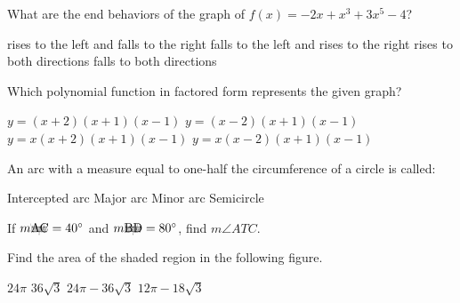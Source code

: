 \begin{questions}
\question What are the end behaviors of the graph of $f(x) = -2x + x^3 + 3x^5 - 4$?

\begin{multicols}{2}
\begin{choices}  
\choice rises to the left and falls to the right
\CorrectChoice falls to the left and rises to the right
\choice rises to both directions 
\choice falls to both directions
\end{choices}
\end{multicols} 

\question Which polynomial function in factored form represents the given graph?
\begin{choices}  
\choice $y = (x+2)(x+1)(x-1)$ 
\choice $y = (x-2)(x+1)(x-1)$ 
\CorrectChoice $y = x(x+2)(x+1)(x-1)$ 
\choice $y = x(x-2)(x+1)(x-1)$ \hspace*{8cm}  
\end{choices}

\question An arc with a measure equal to one-half the circumference of a circle is called: 

\begin{multicols}{4}
\begin{choices}  
\choice Intercepted arc
\choice Major arc
\choice Minor arc
\CorrectChoice Semicircle
\end{choices}
\end{multicols} 

\question If $m\arc{AC}=40\degree $ and $m\arc{BD}=80\degree $, find $m\angle{ATC}$.
\begin{choices} 
\degree 
{}\degree 
{}\degree 
{}\degree 
\end{choices}
\vspace*{-3cm}\hspace*{9cm} 

\question Find the area of the shaded region in the following figure. 
\begin{choices} 
\choice $24\pi$
\choice $36\sqrt{3}$
\CorrectChoice $24\pi - 36\sqrt{3}$
\choice $12\pi - 18\sqrt{3}$
\end{choices}


\end{questions}
